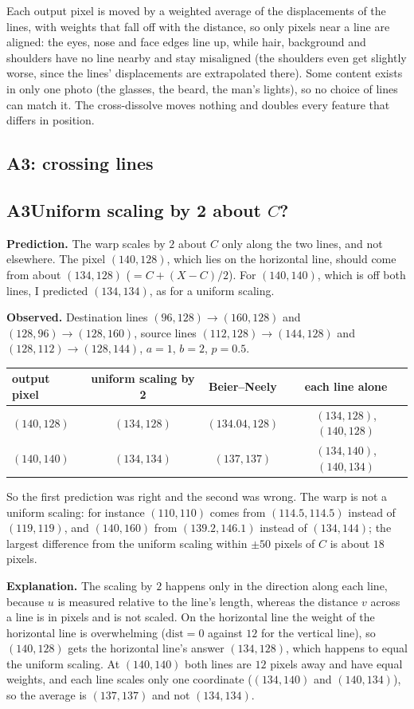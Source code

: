 \documentclass[10pt,a4paper]{article}
\newcommand{\experiment}[5]{%
  \subsection*{#1\quad #2}
  \textbf{Prediction.} #3\par
  \textbf{Observed.} #4\par
  \textbf{Explanation.} #5\par
}
\begin{document}
  {Each output pixel is moved by a weighted average of the displacements of the lines, with weights that fall off
   with the distance, so only pixels near a line are aligned: the eyes, nose and face edges line up, while
   hair, background and shoulders have no line nearby and stay misaligned (the shoulders even get slightly
   worse, since the lines' displacements are extrapolated there). Some content exists in only one photo (the
   glasses, the beard, the man's lights), so no choice of lines can match it. The cross-dissolve moves nothing
   and doubles every feature that differs in position.}

\subsection{A3: crossing lines}
\experiment{A3}{Uniform scaling by 2 about $C$?}
  {The warp scales by $2$ about $C$ only along the two lines, and not elsewhere. The pixel $(140,128)$, which lies
   on the horizontal line, should come from about $(134,128)$ ($=C+(X-C)/2$). For $(140,140)$, which is off both
   lines, I predicted $(134,134)$, as for a uniform scaling.}
  {Destination lines $(96,128)\to(160,128)$ and $(128,96)\to(128,160)$, source lines $(112,128)\to(144,128)$ and
   $(128,112)\to(128,144)$, $a=1$, $b=2$, $p=0.5$.
   \begin{center}\small
   \begin{tabular}{lccc}\toprule
     output pixel & uniform scaling by 2 & Beier--Neely & each line alone\\\midrule
     $(140,128)$ & $(134,128)$ & $(134.04,128)$ & $(134,128)$, $(140,128)$\\
     $(140,140)$ & $(134,134)$ & $(137,137)$ & $(134,140)$, $(140,134)$\\\bottomrule
   \end{tabular}\end{center}
   So the first prediction was right and the second was wrong. The warp is not a uniform scaling: for
   instance $(110,110)$ comes from $(114.5,114.5)$ instead of $(119,119)$, and $(140,160)$ from
   $(139.2,146.1)$ instead of $(134,144)$; the largest difference from the uniform scaling within
   $\pm50$ pixels of $C$ is about $18$ pixels.}
  {The scaling by $2$ happens only in the direction along each line, because $u$ is measured relative to the line's
   length, whereas the distance $v$ across a line is in pixels and is not scaled. On the horizontal line the
   weight of the horizontal line is overwhelming ($\mathrm{dist}=0$ against $12$ for the vertical line), so
   $(140,128)$ gets the horizontal line's answer $(134,128)$, which happens to equal the uniform scaling. At
   $(140,140)$ both lines are $12$ pixels away and have equal weights, and each line scales only one coordinate
   ($(134,140)$ and $(140,134)$), so the average is $(137,137)$ and not $(134,134)$.}
\end{document}
